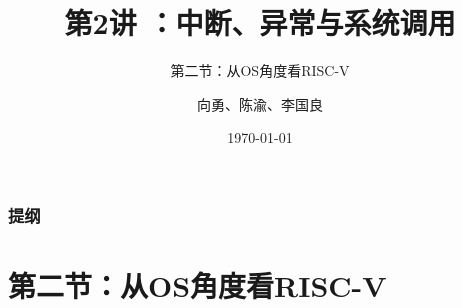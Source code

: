 


\title[第2讲]{第2讲 ：中断、异常与系统调用 } %
\subtitle{第二节：从OS角度看RISC-V}
\author{向勇、陈渝、李国良} %
\date{\today} %



\begin{frame}
\titlepage %
\end{frame}

\begin{frame}
\frametitle{提纲} %
\tableofcontents %
\end{frame}


\section{第二节：从OS角度看RISC-V } %
